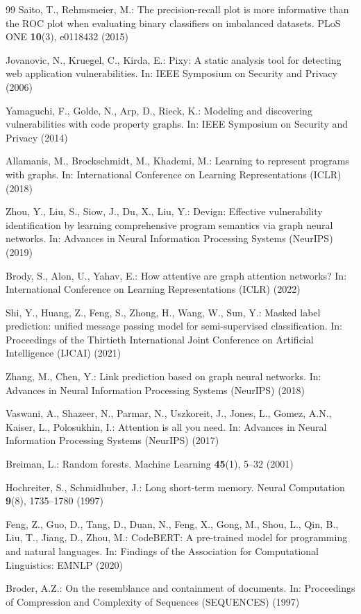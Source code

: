 \documentclass[pdflatex,sn-mathphys-num]{sn-jnl}
\begin{document}
\begin{thebibliography}{99}
Saito, T., Rehmsmeier, M.: The precision-recall plot is more informative than
the ROC plot when evaluating binary classifiers on imbalanced datasets. PLoS
ONE \textbf{10}(3), e0118432 (2015)

Jovanovic, N., Kruegel, C., Kirda, E.: Pixy: A static analysis tool for
detecting web application vulnerabilities. In: IEEE Symposium on Security and
Privacy (2006)

Yamaguchi, F., Golde, N., Arp, D., Rieck, K.: Modeling and discovering
vulnerabilities with code property graphs. In: IEEE Symposium on Security and
Privacy (2014)

Allamanis, M., Brockschmidt, M., Khademi, M.: Learning to represent programs
with graphs. In: International Conference on Learning Representations (ICLR)
(2018)

Zhou, Y., Liu, S., Siow, J., Du, X., Liu, Y.: Devign: Effective vulnerability
identification by learning comprehensive program semantics via graph neural
networks. In: Advances in Neural Information Processing Systems (NeurIPS)
(2019)

Brody, S., Alon, U., Yahav, E.: How attentive are graph attention networks?
In: International Conference on Learning Representations (ICLR) (2022)

Shi, Y., Huang, Z., Feng, S., Zhong, H., Wang, W., Sun, Y.: Masked label
prediction: unified message passing model for semi-supervised classification.
In: Proceedings of the Thirtieth International Joint Conference on Artificial
Intelligence (IJCAI) (2021)

Zhang, M., Chen, Y.: Link prediction based on graph neural networks. In:
Advances in Neural Information Processing Systems (NeurIPS) (2018)

Vaswani, A., Shazeer, N., Parmar, N., Uszkoreit, J., Jones, L., Gomez, A.N.,
Kaiser, L., Polosukhin, I.: Attention is all you need. In: Advances in Neural
Information Processing Systems (NeurIPS) (2017)

Breiman, L.: Random forests. Machine Learning \textbf{45}(1), 5--32 (2001)

Hochreiter, S., Schmidhuber, J.: Long short-term memory. Neural Computation
\textbf{9}(8), 1735--1780 (1997)

Feng, Z., Guo, D., Tang, D., Duan, N., Feng, X., Gong, M., Shou, L., Qin, B.,
Liu, T., Jiang, D., Zhou, M.: CodeBERT: A pre-trained model for programming and
natural languages. In: Findings of the Association for Computational
Linguistics: EMNLP (2020)

Broder, A.Z.: On the resemblance and containment of documents. In: Proceedings
of Compression and Complexity of Sequences (SEQUENCES) (1997)

\end{thebibliography}
\end{document}

